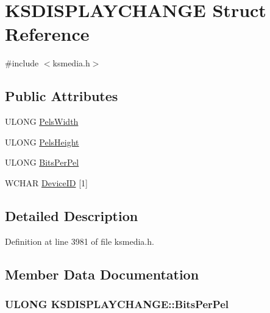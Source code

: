 \hypertarget{struct_k_s_d_i_s_p_l_a_y_c_h_a_n_g_e}{}\section{K\+S\+D\+I\+S\+P\+L\+A\+Y\+C\+H\+A\+N\+GE Struct Reference}
\label{struct_k_s_d_i_s_p_l_a_y_c_h_a_n_g_e}


{\ttfamily \#include $<$ksmedia.\+h$>$}

\subsection*{Public Attributes}
\begin{DoxyCompactItemize}
\item 
U\+L\+O\+NG \hyperlink{struct_k_s_d_i_s_p_l_a_y_c_h_a_n_g_e_a0833b0bb68805d52a74c146f3e92db67}{Pels\+Width}
\item 
U\+L\+O\+NG \hyperlink{struct_k_s_d_i_s_p_l_a_y_c_h_a_n_g_e_ae85de154aa62518ccd7cf9e1fd9577ab}{Pels\+Height}
\item 
U\+L\+O\+NG \hyperlink{struct_k_s_d_i_s_p_l_a_y_c_h_a_n_g_e_ae781a41b7e27d791e49e9d5fcbd8c152}{Bits\+Per\+Pel}
\item 
W\+C\+H\+AR \hyperlink{struct_k_s_d_i_s_p_l_a_y_c_h_a_n_g_e_a526e04c64b3e2b03185725b6cf142021}{Device\+ID} \mbox{[}1\mbox{]}
\end{DoxyCompactItemize}


\subsection{Detailed Description}


Definition at line 3981 of file ksmedia.\+h.



\subsection{Member Data Documentation}
\subsubsection[{\texorpdfstring{Bits\+Per\+Pel}{BitsPerPel}}]{\setlength{\rightskip}{0pt plus 5cm}U\+L\+O\+NG K\+S\+D\+I\+S\+P\+L\+A\+Y\+C\+H\+A\+N\+G\+E\+::\+Bits\+Per\+Pel}\hypertarget{struct_k_s_d_i_s_p_l_a_y_c_h_a_n_g_e_ae781a41b7e27d791e49e9d5fcbd8c152}{}\label{struct_k_s_d_i_s_p_l_a_y_c_h_a_n_g_e_ae781a41b7e27d791e49e9d5fcbd8c152}


